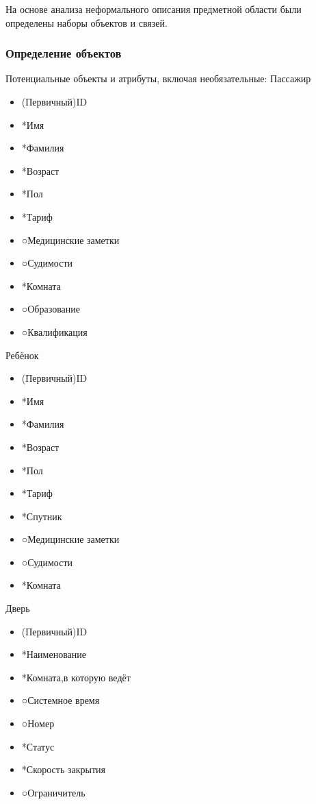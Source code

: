 На основе анализа неформального описания предметной области были определены наборы объектов и связей.

\subsubsection {Определение объектов}

Потенциальные объекты и атрибуты, включая необязательные:
Пассажир
\begin{itemize}
	\item (Первичный)ID
	\item *Имя
	\item *Фамилия
	\item *Возраст
	\item *Пол
	\item *Тариф
	\item ○Медицинские заметки
	\item ○Судимости
	\item *Комната
	\item ○Образование 
	\item ○Квалификация	
\end{itemize}

Ребёнок
\begin{itemize}
	\item (Первичный)ID
	\item *Имя
	\item *Фамилия
	\item *Возраст
	\item *Пол
	\item *Тариф
	\item *Спутник
	\item ○Медицинские заметки
	\item ○Судимости
	\item *Комната	
\end{itemize}

Дверь
\begin{itemize}
	\item (Первичный)ID
	\item *Наименование
	\item *Комната,в которую ведёт
	\item ○Системное время
	\item ○Номер
	\item *Статус
	\item *Скорость закрытия
	\item ○Ограничитель
\end{itemize}

